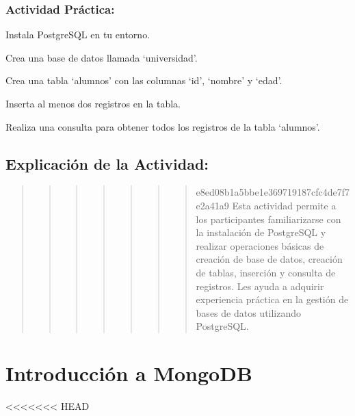 \documentclass[
  a4paper,
  DIV=11,
  numbers=noendperiod,
  onepage,
  openany]{scrreprt}
\begin{document}
\hypertarget{actividad-pruxe1ctica-61}{%
\subsection{Actividad Práctica:}\label{actividad-pruxe1ctica-61}}

Instala PostgreSQL en tu entorno.

Crea una base de datos llamada `universidad'.

Crea una tabla `alumnos' con las columnas `id', `nombre' y `edad'.

Inserta al menos dos registros en la tabla.

Realiza una consulta para obtener todos los registros de la tabla
`alumnos'.

\hypertarget{explicaciuxf3n-de-la-actividad-67}{%
\section{Explicación de la
Actividad:}\label{explicaciuxf3n-de-la-actividad-67}}

\begin{quote}
\begin{quote}
\begin{quote}
\begin{quote}
\begin{quote}
\begin{quote}
\begin{quote}
e8ed08b1a5bbe1e369719187cfc4de7f7e2a41a9 Esta actividad permite a los
participantes familiarizarse con la instalación de PostgreSQL y realizar
operaciones básicas de creación de base de datos, creación de tablas,
inserción y consulta de registros. Les ayuda a adquirir experiencia
práctica en la gestión de bases de datos utilizando PostgreSQL.
\end{quote}
\end{quote}
\end{quote}
\end{quote}
\end{quote}
\end{quote}
\end{quote}

\hypertarget{introducciuxf3n-a-mongodb}{%
\chapter{Introducción a MongoDB}\label{introducciuxf3n-a-mongodb}}

\textless\textless\textless\textless\textless\textless\textless{} HEAD
\end{document}
